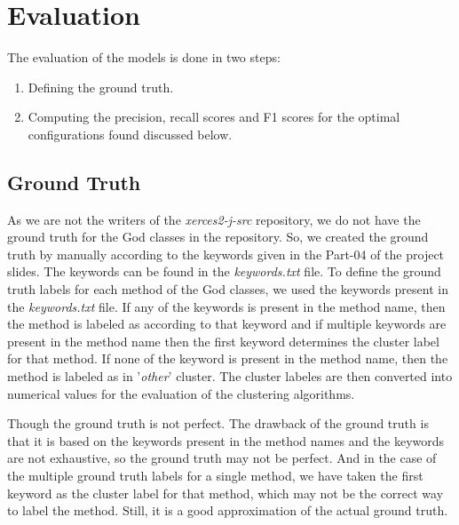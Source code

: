 \documentclass{article}
\newcommand\templateInstruction[1]{
\hl{#1}
}
\begin{document}


\section{Evaluation}
The evaluation of the models is done in two steps:
\begin{enumerate}
    \item Defining the ground truth.
    \item Computing the precision, recall scores and F1 scores for the optimal configurations found discussed below.
\end{enumerate}
\subsection{Ground Truth}
As we are not the writers of the \textit{xerces2-j-src} repository, we do not have the ground truth for the God classes in the repository. So, we created the ground truth by manually according to the keywords given in the Part-04 of the project slides. The keywords can be found in the \textit{keywords.txt} file.
To define the ground truth labels for each method of the God classes, we used the keywords present in the \textit{keywords.txt} file. If any of the keywords is present in the method name, then the method is labeled as according to that keyword and if multiple keywords are present in the method name then the first keyword determines the cluster label for that method. 
If none of the keyword is present in the method name, then the method is labeled as in '\textit{other}' cluster. 
The cluster labeles are then converted into numerical values for the evaluation of the clustering algorithms.

Though the ground truth is not perfect. The drawback of the ground truth is that it is based on the keywords present in the method names and the keywords are not exhaustive, so the ground truth may not be perfect.
And in the case of the multiple ground truth labels for a single method, we have taken the first keyword as the cluster label for that method, which may not be the correct way to label the method.
Still, it is a good approximation of the actual ground truth.


\end{document}
